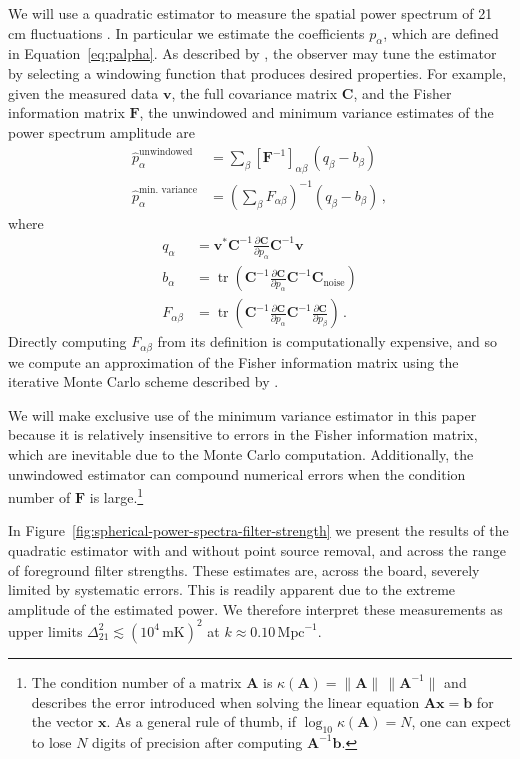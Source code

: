\documentclass[twocolumn]{aastex62}
\renewcommand{\b}{\pmb}
\DeclareMathOperator{\tr}{tr} %
\begin{document}
We will use a quadratic estimator to measure the spatial power spectrum of 21\,cm fluctuations
\citep{1997PhRvD..55.5895T}. In particular we estimate the coefficients $p_\alpha$, which are
defined in Equation~\ref{eq:palpha}. As described by \citet{2003NewA....8..581P}, the observer may
tune the estimator by selecting a windowing function that produces desired properties. For example,
given the measured data $\b v$, the full covariance matrix $\b C$, and the Fisher information matrix
$\b F$, the unwindowed and minimum variance estimates of the power spectrum amplitude are
\begin{align}
    \hat{p}_\alpha^\text{unwindowed} &= \sum_\beta [\b F^{-1}]_{\alpha\beta}\,(q_\beta-b_\beta) \\
    \hat{p}_\alpha^\text{min. variance} &= \left(\sum_\beta
        F_{\alpha\beta}\right)^{-1}(q_\beta-b_\beta)\,,
\end{align}
where
\begin{align}
    q_\alpha &= \b v^*\b C^{-1}\frac{\partial\b C}{\partial p_\alpha}\b C^{-1}\b v \\
    b_\alpha &= \tr\left(\b C^{-1}\frac{\partial\b C}{\partial p_\alpha}
                         \b C^{-1}\b C_\text{noise}\right) \\
    F_{\alpha\beta} &= \tr\left(\b C^{-1}\frac{\partial\b C}{\partial p_\alpha}
                                \b C^{-1}\frac{\partial\b C}{\partial p_\beta}\right)\,.
\end{align}
Directly computing $F_{\alpha\beta}$ from its definition is computationally expensive, and so we
compute an approximation of the Fisher information matrix using the iterative Monte Carlo scheme
described by \citet{2013PhRvD..87d3005D}.

We will make exclusive use of the minimum variance estimator in this paper because it is relatively
insensitive to errors in the Fisher information matrix, which are inevitable due to the Monte Carlo
computation. Additionally, the unwindowed estimator can compound numerical errors when the condition
number of $\b F$ is large.\footnote{
    The condition number of a matrix $\b A$ is $\kappa(\b A) = \|\b A\|\,\|\b A^{-1}\|$ and
    describes the error introduced when solving the linear equation $\b A\b x=\b b$ for the vector
    $\b x$. As a general rule of thumb, if $\log_{10}\kappa(\b A) = N$, one can expect to lose $N$
    digits of precision after computing $\b A^{-1}\b b$.
}

In Figure~\ref{fig:spherical-power-spectra-filter-strength} we present the results of the quadratic
estimator with and without point source removal, and across the range of foreground filter
strengths. These estimates are, across the board, severely limited by systematic errors. This is
readily apparent due to the extreme amplitude of the estimated power.  We therefore interpret these
measurements as upper limits $\Delta_{21}^2 \lesssim (10^4\,\text{mK})^2$ at $k\approx
0.10\,\text{Mpc}^{-1}$.
\end{document}
